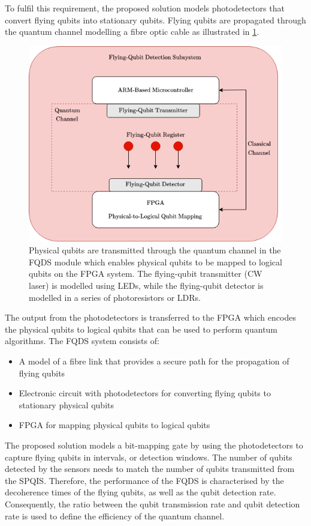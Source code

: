 To fulfil this requirement, the proposed solution models photodetectors that convert flying qubits into stationary qubits. Flying qubits are propagated through the quantum channel modelling a fibre optic cable as illustrated in \ref{fig:fqds-overview}. 
\begin{figure}[!ht]
	\centering
	\includegraphics[width=0.85\linewidth]{body/ch4/figs/fqds-overview}
	\caption[Flying-Qubit Detection (FQDS) Subsystem Overview.]{Physical qubits are transmitted through the quantum channel in the FQDS module which enables physical qubits to be mapped to logical qubits on the FPGA system. The flying-qubit transmitter (CW laser) is modelled using LEDs, while the flying-qubit detector is modelled in a series of photoresistors or LDRs.}
	\label{fig:fqds-overview}
\end{figure}

The output from the photodetectors is transferred to the FPGA which encodes the physical qubits to logical qubits that can be used to perform quantum algorithms. The FQDS system consists of:
\begin{itemize}
	\item 
	A model of a fibre link that provides a secure path for the propagation of flying qubits
	\item 
	Electronic circuit with photodetectors for converting flying qubits to stationary physical qubits
	\item 
	FPGA for mapping physical qubits to logical qubits
\end{itemize}
The proposed solution models a bit-mapping gate by using the photodetectors to capture flying qubits in intervals, or detection windows. The number of qubits detected by the sensors needs to match the number of qubits transmitted from the SPQIS. Therefore, the performance of the FQDS is characterised by the decoherence times of the flying qubits, as well as the qubit detection rate. Consequently, the ratio between the qubit transmission rate and qubit detection rate is used to define the efficiency of the quantum channel. 

